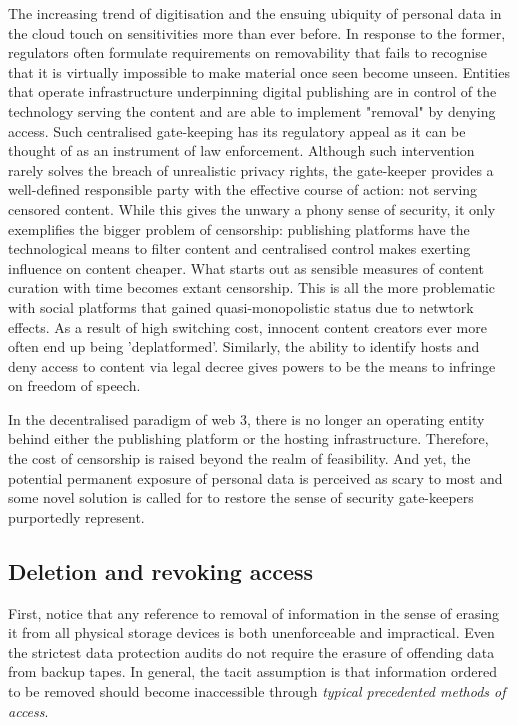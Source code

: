 The increasing trend of digitisation and the ensuing ubiquity of personal data in the cloud touch on sensitivities more than ever before. 
In response to the former, regulators often formulate requirements on removability that fails to recognise 
that it is virtually impossible to make material once seen become unseen.
Entities that operate infrastructure underpinning digital publishing are in control of the technology serving the content and  are able to implement "removal" by denying access.
Such centralised gate-keeping  has its regulatory appeal as it can be thought of as an instrument of law enforcement. Although such intervention rarely solves the breach of unrealistic privacy rights, the gate-keeper provides a well-defined responsible party with the effective course of action: not serving censored content.
While this gives the unwary a phony sense of security, it only exemplifies the bigger problem of censorship: publishing platforms have the technological means to filter content and centralised control makes exerting influence on content cheaper.  What starts out as sensible measures of content curation with time becomes extant censorship. This is all the more problematic with social platforms that gained quasi-monopolistic status due to netwtork effects. As a result of high switching cost, innocent content creators ever more often end up being 'deplatformed'. Similarly, the ability to identify hosts and deny access to content via legal decree gives powers to be the means to infringe on freedom of speech. 

In the decentralised paradigm of web 3, there is no longer an operating entity behind either the publishing platform or the hosting infrastructure. Therefore, the cost of censorship is raised beyond the realm of feasibility. And yet, the potential permanent exposure of personal data is perceived as scary to most and some novel solution is called for to restore the sense of security gate-keepers purportedly represent. 

\subsection{Deletion and revoking access}

First, notice that any reference to removal of information in the sense of erasing it from all physical storage devices is both unenforceable and impractical. Even the strictest data protection audits do not require the erasure of offending data from backup tapes. In general, the tacit assumption is that information ordered to be removed should become inaccessible through \emph{typical precedented methods of access}.

